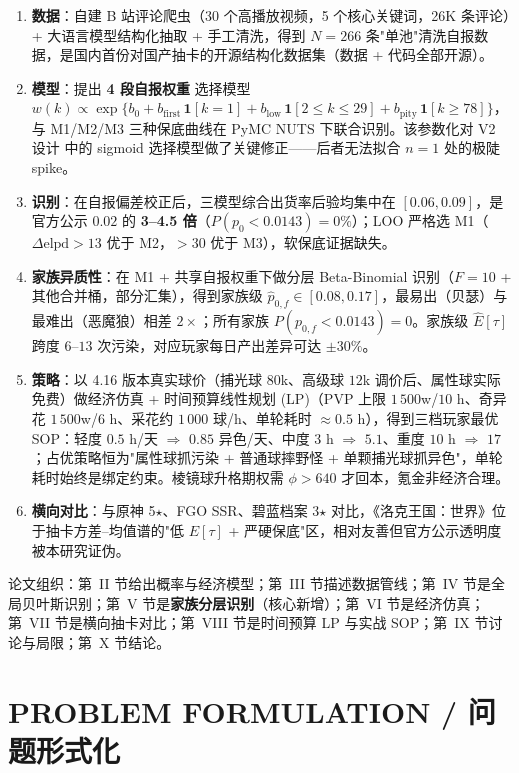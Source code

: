 \documentclass[journal]{IEEEtran}
\begin{document}
\begin{enumerate}
    \item \textbf{数据}：自建 B 站评论爬虫（30 个高播放视频，5 个核心关键词，26K 条评论）+ 大语言模型结构化抽取 + 手工清洗，得到 $N=266$ 条"单池"清洗自报数据，是国内首份对国产抽卡的开源结构化数据集（数据 + 代码全部开源）。
    \item \textbf{模型}：提出 \textbf{4 段自报权重} 选择模型 $w(k) \propto \exp\{b_0 + b_{\text{first}}\,\mathbf{1}[k{=}1] + b_{\text{low}}\,\mathbf{1}[2{\le}k{\le}29] + b_{\text{pity}}\,\mathbf{1}[k{\ge}78]\}$，与 M1/M2/M3 三种保底曲线在 PyMC NUTS 下联合识别。该参数化对 V2 设计 \cite{ref_v2_design} 中的 sigmoid 选择模型做了关键修正——后者无法拟合 $n=1$ 处的极陡 spike。
    \item \textbf{识别}：在自报偏差校正后，三模型综合出货率后验均集中在 $[0.06, 0.09]$，是官方公示 $0.02$ 的 \textbf{3--4.5 倍}（$P(p_0 < 0.0143) = 0\%$）；LOO 严格选 M1（$\Delta\text{elpd} > 13$ 优于 M2，$> 30$ 优于 M3），软保底证据缺失。
    \item \textbf{家族异质性}：在 M1 + 共享自报权重下做分层 Beta-Binomial 识别（$F = 10$ + 其他合并桶，部分汇集），得到家族级 $\hat p_{0,f} \in [0.08, 0.17]$，最易出（贝瑟）与最难出（恶魔狼）相差 $2\times$；所有家族 $P(p_{0,f} < 0.0143) = 0$。家族级 $\hat E[\tau]$ 跨度 $6$--$13$ 次污染，对应玩家每日产出差异可达 $\pm 30\%$。
    \item \textbf{策略}：以 4.16 版本真实球价（捕光球 $80$k、高级球 $12$k 调价后、属性球实际免费）做经济仿真 + 时间预算线性规划 (LP)（PVP 上限 $1\,500$w/$10$ h、奇异花 $1\,500$w/$6$ h、采花约 $1\,000$ 球/h、单轮耗时 $\approx 0.5$ h），得到三档玩家最优 SOP：轻度 $0.5$ h/天 $\Rightarrow$ $0.85$ 异色/天、中度 $3$ h $\Rightarrow$ $5.1$、重度 $10$ h $\Rightarrow$ $17$；占优策略恒为"属性球抓污染 + 普通球摔野怪 + 单颗捕光球抓异色"，单轮耗时始终是绑定约束。棱镜球升格期权需 $\phi > 640$ 才回本，氪金非经济合理。
    \item \textbf{横向对比}：与原神 5$\star$、FGO SSR、碧蓝档案 3$\star$ 对比，《洛克王国：世界》位于抽卡方差--均值谱的"低 $E[\tau]$ + 严硬保底"区，相对友善但官方公示透明度被本研究证伪。
\end{enumerate}

论文组织：第~II 节给出概率与经济模型；第~III 节描述数据管线；第~IV 节是全局贝叶斯识别；第~V 节是\textbf{家族分层识别}（核心新增）；第~VI 节是经济仿真；第~VII 节是横向抽卡对比；第~VIII 节是时间预算 LP 与实战 SOP；第~IX 节讨论与局限；第~X 节结论。


\section{PROBLEM FORMULATION / 问题形式化}
\end{document}
